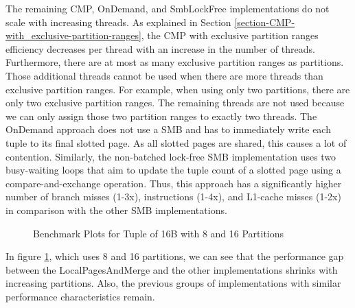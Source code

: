 The remaining \ac{CMP}, OnDemand, and SmbLockFree implementations do not scale with increasing threads.
As explained in Section \ref{section-CMP-with_exclusive-partition-ranges}, the \ac{CMP} with exclusive partition ranges efficiency decreases per thread with an increase in the number of threads.
Furthermore, there are at most as many exclusive partition ranges as partitions.
Those additional threads cannot be used when there are more threads than exclusive partition ranges.
For example, when using only two partitions, there are only two exclusive partition ranges.
The remaining threads are not used because we can only assign those two partition ranges to exactly two threads.
The OnDemand approach does not use a \ac{SMB} and has to immediately write each tuple to its final slotted page.
As all slotted pages are shared, this causes a lot of contention.
Similarly, the non-batched lock-free \ac{SMB} implementation uses two busy-waiting loops that aim to update the tuple count of a slotted page using a compare-and-exchange operation.
Thus, this approach has a significantly higher number of branch misses (1-3x), instructions (1-4x), and L1-cache misses (1-2x) in comparison with the other \ac{SMB} implementations.
\begin{figure}[h]
  \centering
  \begin{subfigure}{.49\textwidth}
    \centering
    \resizebox{\linewidth}{!}{}
  \end{subfigure}
  \begin{subfigure}{.49\textwidth}
    \centering
    \resizebox{\linewidth}{!}{}
  \end{subfigure}
  \begin{subfigure}{\textwidth}
    \centering
    \resizebox{\linewidth}{!}{}
  \end{subfigure}
  \caption[Shuffle Benchmark Plots for Tuple of 16B with 8 and 16 Partitions]{Benchmark Plots for Tuple of 16B with 8 and 16 Partitions}
  \label{plot-shuffle-16B-8-16}
\end{figure}

In figure \ref{plot-shuffle-16B-8-16}, which uses 8 and 16 partitions, we can see that the performance gap between the LocalPagesAndMerge and the other implementations shrinks with increasing partitions.
Also, the previous groups of implementations with similar performance characteristics remain.

